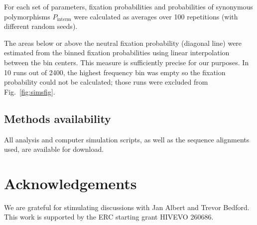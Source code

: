 \documentclass[rmp, twocolumn]{revtex4}
\newcommand{\FIG}[1]{Fig.~\ref{fig:#1}}
\begin{document}
For each set of parameters, fixation probabilities and probabilities of
synonymous polymorphisms $P_\text{interm}$ were calculated as averages over
100 repetitions (with different random seeds).

The areas below or above the neutral fixation probability (diagonal line)
were estimated from the binned fixation probabilities using linear
interpolation between the bin centers. This measure is sufficiently precise for
our purposes. In 10 runs out of 2400, the highest frequency bin was empty so the
fixation probability could not be calculated; those runs were excluded from 
\FIG{simsfig}.

\subsection{Methods availability}
All analysis and computer simulation scripts, as well as the sequence alignments
used, are available for download.

\section*{Acknowledgements}
We are grateful for stimulating discussions with Jan Albert and Trevor Bedford.
This work is supported by the ERC starting grant HIVEVO 260686.



\end{document}
